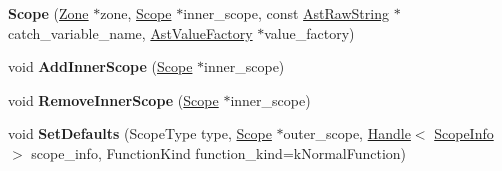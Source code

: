 \begin{DoxyCompactItemize}
\item 
{\bfseries Scope} (\hyperlink{classv8_1_1internal_1_1_zone}{Zone} $\ast$zone, \hyperlink{classv8_1_1internal_1_1_scope}{Scope} $\ast$inner\+\_\+scope, const \hyperlink{classv8_1_1internal_1_1_ast_raw_string}{Ast\+Raw\+String} $\ast$catch\+\_\+variable\+\_\+name, \hyperlink{classv8_1_1internal_1_1_ast_value_factory}{Ast\+Value\+Factory} $\ast$value\+\_\+factory)\hypertarget{classv8_1_1internal_1_1_scope_a684adc699ef5533346f5d9b3079e623b}{}\label{classv8_1_1internal_1_1_scope_a684adc699ef5533346f5d9b3079e623b}

\item 
void {\bfseries Add\+Inner\+Scope} (\hyperlink{classv8_1_1internal_1_1_scope}{Scope} $\ast$inner\+\_\+scope)\hypertarget{classv8_1_1internal_1_1_scope_a5e7438b27a35b428cb4eae811234c75e}{}\label{classv8_1_1internal_1_1_scope_a5e7438b27a35b428cb4eae811234c75e}

\item 
void {\bfseries Remove\+Inner\+Scope} (\hyperlink{classv8_1_1internal_1_1_scope}{Scope} $\ast$inner\+\_\+scope)\hypertarget{classv8_1_1internal_1_1_scope_abdb19d3ce340ac67f08e841bef38668b}{}\label{classv8_1_1internal_1_1_scope_abdb19d3ce340ac67f08e841bef38668b}

\item 
void {\bfseries Set\+Defaults} (Scope\+Type type, \hyperlink{classv8_1_1internal_1_1_scope}{Scope} $\ast$outer\+\_\+scope, \hyperlink{classv8_1_1internal_1_1_handle}{Handle}$<$ \hyperlink{classv8_1_1internal_1_1_scope_info}{Scope\+Info} $>$ scope\+\_\+info, Function\+Kind function\+\_\+kind=k\+Normal\+Function)\hypertarget{classv8_1_1internal_1_1_scope_a789294d47e9f297ddbf61eaf96a4f54e}{}\label{classv8_1_1internal_1_1_scope_a789294d47e9f297ddbf61eaf96a4f54e}

\end{DoxyCompactItemize}
